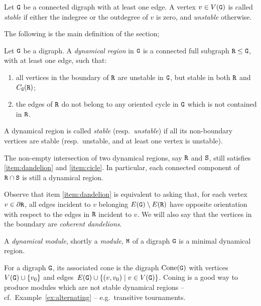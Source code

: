 \documentclass{amsart}
\begin{document}
\begin{defn}
Let ${\tt G}$ be a connected digraph with at least one edge. A vertex $v\in V({\tt G})$ is called \emph{stable} if either the indegree or the outdegree of $v$ is zero, and \emph{unstable} otherwise. 
\end{defn}

The following is the main definition of the section;

\begin{defn}\label{def:dynamicalregion}
Let ${\tt G}$ be a digraph.
A \emph{dynamical region} in ${\tt G}$ is a connected full subgraph ${\tt R} \leq {\tt G}$, with at least one edge, such that: 
\begin{enumerate}[label = (\alph*)]
    \item\label{item:dandelion} all vertices in the boundary of ${\tt R}$ are unstable in ${\tt G}$, but stable in both ${\tt R}$ and $C_{{\tt G}}({\tt R})$;
    \item\label{item:cicle} the edges of ${\tt R}$ do not belong to any oriented cycle in ${\tt G}$ which is not contained in ${\tt R}$.
\end{enumerate}
A dynamical region is called \emph{stable} (resp.~\emph{unstable}) if all its non-boundary vertices are stable (resp.~unstable, and at least one vertex is unstable).
\end{defn}

\begin{rem}\label{rem:intersectionregions}
The non-empty intersection of two dynamical regions, say ${\tt R} $ and ${\tt S}$, still satisfies \ref{item:dandelion} and \ref{item:cicle}. In particular, each connected component of ${\tt R} \cap {\tt S}$ is still a dynamical region.
\end{rem}

Observe that item \ref{item:dandelion} is equivalent to asking that, for each vertex $v\in \partial{\tt R}$, all edges incident to $v$ belonging $E({\tt G})\setminus E({\tt R})$ have opposite orientation with respect to the edges in ${\tt R}$ incident to $v$. We will also say that the vertices in the boundary are \emph{coherent dandelions}.



\begin{defn}
A \emph{dynamical module}, shortly a \emph{module}, ${\tt M}$ of a digraph ${\tt G}$ is a minimal dynamical region.
\end{defn}

 For a digraph ${\tt G}$, its associated cone is the digraph $\mathrm{Cone} ({\tt G})$ with vertices $V({\tt G}) \cup \{ v_0 \}$ and edges~$E({\tt G}) \cup \{ (v, v_0) \mid v\in V({\tt G})\}$. Coning is a good way to produce modules which are not stable dynamical regions -- cf.~Example~\ref{ex:alternating} -- e.g.~transitive tournaments.
%
\end{document}
